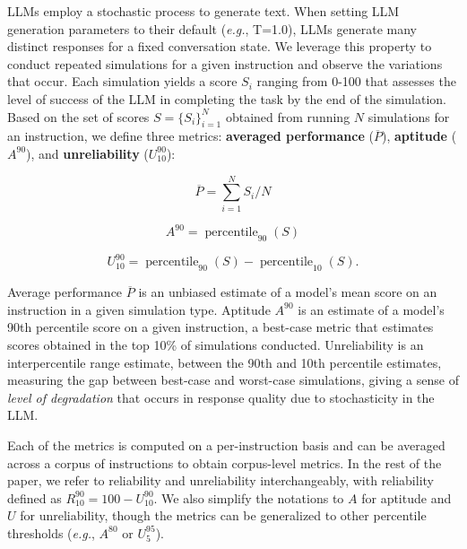 \documentclass{article}
\begin{document}
LLMs employ a stochastic process to generate text. When setting LLM generation parameters to their default (\textit{e.g.}, T=1.0), LLMs generate many distinct responses for a fixed conversation state. We leverage this property to conduct repeated simulations for a given instruction and observe the variations that occur.
Each simulation yields a score $S_{i}$ ranging from 0-100 that assesses the level of success of the LLM in completing the task by the end of the simulation. Based on the set of scores $S = \{S_i\}_{i=1}^N$ obtained from running $N$ simulations for an instruction, we define three metrics: \textbf{averaged performance} ($\overline{P}$), \textbf{aptitude} ($A^{90}$), and \textbf{unreliability} ($U_{10}^{90}$):

\vspace{-1.0em}
\begin{center}
\begin{minipage}{0.2\textwidth}
\[
\overline{P} = \displaystyle\sum_{i=1}^N S_{i} \big/ N
\]
\end{minipage}
\hfill
\begin{minipage}{0.3\textwidth}
\[
A^{90} = \operatorname{percentile}_{90}(S)
\]
\end{minipage}
\hfill
\begin{minipage}{0.48\textwidth}
\[
U_{10}^{90} = \operatorname{percentile}_{90}(S) - \operatorname{percentile}_{10}(S).
\]
\end{minipage}
\end{center}
\vspace{-0.3em}

Average performance $\overline{P}$ is an unbiased estimate of a model's mean score on an instruction in a given simulation type. Aptitude $A^{90}$ is an estimate of a model's 90th percentile score on a given instruction, a best-case metric that estimates scores obtained in the top 10\% of simulations conducted. Unreliability is an interpercentile range estimate, between the 90th and 10th percentile estimates, measuring the gap between best-case and worst-case simulations, giving a sense of \textit{level of degradation} that occurs in response quality due to stochasticity in the LLM.

Each of the metrics is computed on a per-instruction basis and can be averaged across a corpus of instructions to obtain corpus-level metrics. In the rest of the paper, we refer to reliability and unreliability interchangeably, with reliability defined as $R_{10}^{90} = 100 - U_{10}^{90}$. We also simplify the notations to $A$ for aptitude and $U$ for unreliability, though the metrics can be generalized to other percentile thresholds (\textit{e.g.}, $A^{80}$ or $U_{5}^{95}$).
\end{document}
